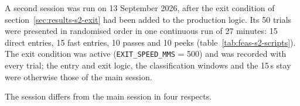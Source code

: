 

A second session was run on 13 September 2026, after the exit condition of
section~\ref{sec:results-s2-exit} had been added to the production logic. Its
50 trials were presented in randomised order in one continuous run of
27 minutes: 15 direct entries, 15 fast entries, 10 passes and 10 peeks
(table~\ref{tab:feas-s2-scripts}). The exit condition was active
(\texttt{EXIT\_SPEED\_MMS} = 500) and was recorded with every trial; the entry
and exit logic, the classification windows and the 15\,s stay were otherwise
those of the main session.

The session differs from the main session in four respects.


